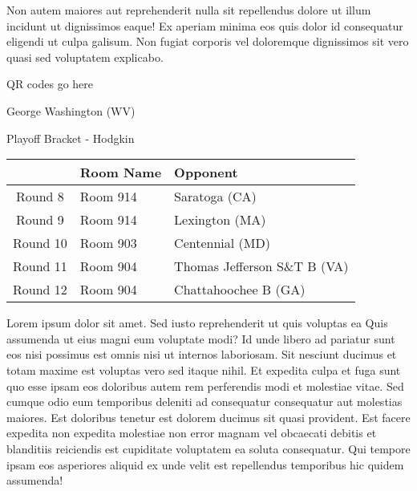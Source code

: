 \documentclass{article}%
\begin{document}
\newline%
Non autem maiores aut reprehenderit nulla sit repellendus dolore ut illum incidunt ut dignissimos eaque! Ex aperiam minima eos quis dolor id consequatur eligendi ut culpa galisum. Non fugiat corporis vel doloremque dignissimos sit vero quasi sed voluptatem explicabo.\newline%
\newline%
%
\vspace*{30pt}%
\begin{center}%
\begin{Huge}%
QR codes go here%
\end{Huge}%
\end{center}%
\newpage%
\begin{center}%
\begin{Huge}%
George Washington (WV)%
\end{Huge}%
\vspace*{8pt}%
\linebreak%
\begin{Large}%
Playoff Bracket {-} Hodgkin%
\end{Large}%
\end{center}%
\begin{tabularx}{\textwidth}{|c|Y|Y|}%
\hline%
&Room Name&Opponent\\%
\hline%
Round 8&Room 914&Saratoga (CA)\\%
Round 9&Room 914&Lexington (MA)\\%
Round 10&Room 903&Centennial (MD)\\%
Round 11&Room 904&Thomas Jefferson S\&T B (VA)\\%
Round 12&Room 904&Chattahoochee B (GA)\\%
\hline%
\end{tabularx}%
\vspace*{8pt}%
\linebreak%
\newline%
\newline%
Lorem ipsum dolor sit amet. Sed iusto reprehenderit ut quis voluptas ea Quis assumenda ut eius magni eum voluptate modi? Id unde libero ad pariatur sunt eos nisi possimus est omnis nisi ut internos laboriosam. Sit nesciunt ducimus et totam maxime est voluptas vero sed itaque nihil. Et expedita culpa et fuga sunt quo esse ipsam eos doloribus autem rem perferendis modi et molestiae vitae.\newline%
\newline%
Sed cumque odio eum temporibus deleniti ad consequatur consequatur aut molestias maiores. Est doloribus tenetur est dolorem ducimus sit quasi provident. Est facere expedita non expedita molestiae non error magnam vel obcaecati debitis et blanditiis reiciendis est cupiditate voluptatem ea soluta consequatur. Qui tempore ipsam eos asperiores aliquid ex unde velit est repellendus temporibus hic quidem assumenda!\newline%
\end{document}
